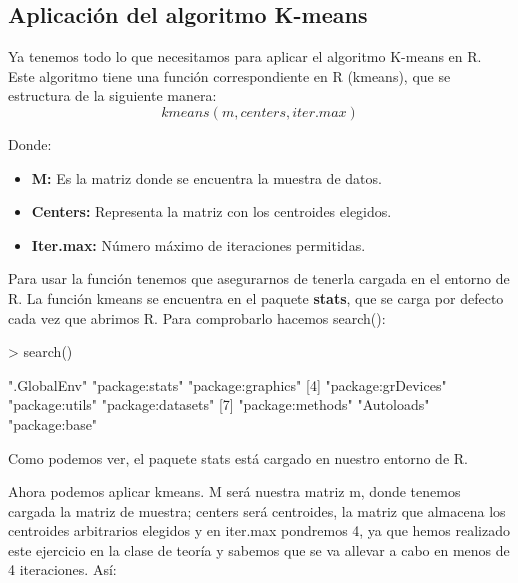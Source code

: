 \documentclass[a4paper]{article}
\begin{document}
\subsection{Aplicación del algoritmo K-means}Ya tenemos todo lo que necesitamos para aplicar el algoritmo K-means en R. Este algoritmo tiene una función correspondiente en R (kmeans), que se estructura de la siguiente manera:
\begin{equation}
kmeans(m, centers, iter.max)
\end{equation}

Donde:
\begin{itemize}
	\item \textbf{{M:}} Es la matriz donde se encuentra la muestra de datos.
	\item \textbf{{Centers:}} Representa la matriz con los centroides elegidos.
	\item \textbf{{Iter.max:}} Número máximo de iteraciones permitidas.
\end{itemize}

Para usar la función tenemos que asegurarnos de tenerla cargada en el entorno de R. La función kmeans se encuentra en el paquete \textbf{stats}, que se carga por defecto cada vez que abrimos R. Para comprobarlo hacemos search():

\begin{Schunk}
\begin{Sinput}
> search()
\end{Sinput}
\begin{Soutput}
[1] ".GlobalEnv"        "package:stats"     "package:graphics" 
[4] "package:grDevices" "package:utils"     "package:datasets" 
[7] "package:methods"   "Autoloads"         "package:base"     
\end{Soutput}
\end{Schunk}

Como podemos ver, el paquete stats está cargado en nuestro entorno de R.

Ahora podemos aplicar kmeans. M será nuestra matriz m, donde tenemos cargada la matriz de muestra; centers será centroides, la matriz que almacena los centroides arbitrarios elegidos y en iter.max pondremos 4, ya que hemos realizado este ejercicio en la clase de teoría y sabemos que se va allevar a cabo en menos de 4 iteraciones. Así:
\end{document}
